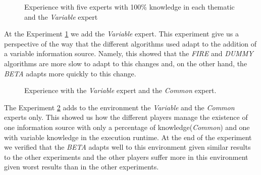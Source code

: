 \documentclass{llncs}
\begin{document}
\begin{figure}
\centering
{}
\caption{Experience with five experts with 100\% knowledge in each thematic and the \textit{Variable} expert}
\label{vary}
\end{figure}

At the Experiment \ref{vary} we add the \textit{Variable} expert.  This experiment give us a perspective of the way that the different algorithms used adapt to the addition of a variable information source. Namely, this showed that the \textit{FIRE} and \textit{DUMMY} algorithms are more slow to adapt to this changes and, on the other hand, the \textit{BETA} adapts more quickly to this change.

\begin{figure}
\centering
{}
\caption{Experience with the \textit{Variable} expert and the \textit{Common} expert.}
\label{varycommon}
\end{figure}

The Experiment \ref{varycommon} adds to the environment the \textit{Variable} and the \textit{Common} experts only. This showed us how the different players manage the existence of one information source with only a percentage of knowledge(\textit{Common}) and one with variable knowledge in the execution runtime. At the end of the experiment we verified that the \textit{BETA} adapts well to this environment given similar results to the other experiments and the other players suffer more in this environment given worst results than in the other experiments.
 
\end{document}
